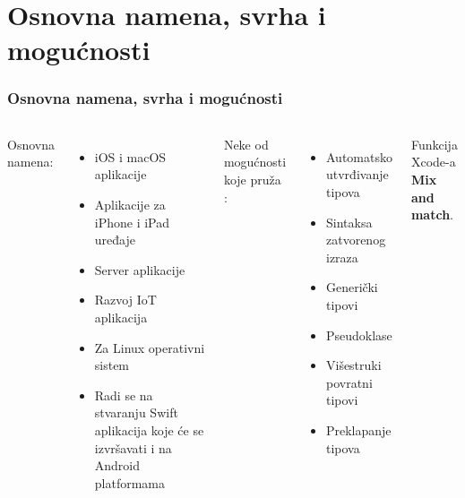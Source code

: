 \documentclass{beamer}
\begin{document}
\section{Osnovna namena, svrha i mogućnosti}
\begin{frame}
\frametitle{Osnovna namena, svrha i mogućnosti}
\begin{columns}[t]

Osnovna namena:
\begin{itemize}
\item iOS i macOS aplikacije
\item Aplikacije za iPhone i iPad uređaje
\item Server aplikacije
\item Razvoj IoT aplikacija
\item Za Linux operativni sistem
\item Radi se na
stvaranju Swift aplikacija koje će se izvršavati i na Android platformama
\end{itemize}

Neke od mogućnosti koje pruža \cite{mastering_swift3}:
\begin{itemize}
\item{Automatsko utvrđivanje tipova}
\item{Sintaksa zatvorenog izraza}
\item{Generički tipovi}
\item{Pseudoklase}
\item{Višestruki povratni tipovi}
\item{Preklapanje tipova}
\end{itemize}
Funkcija Xcode-a \textbf{Mix and match}.

\end{columns}
\end{frame}
\end{document}
